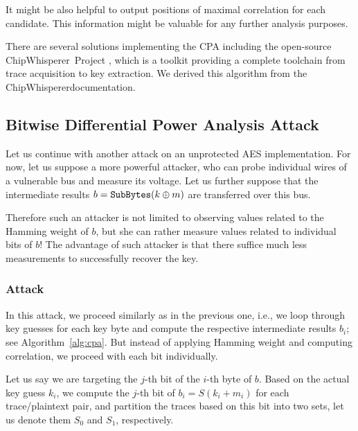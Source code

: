 	\begin{note}
	\label{note:leakpos}
		It might be also helpful to output positions of maximal correlation for each candidate. This information might be valuable for any further analysis purposes.
	\end{note}
	
	There are several solutions implementing the CPA including the open-source ChipWhisperer\texttrademark\ Project \cite{chipwhisperer}, which is a toolkit providing a complete toolchain from trace acquisition to key extraction. We derived this algorithm from the ChipWhisperer\texttrademark documentation.



\subsection{Bitwise Differential Power Analysis Attack}

Let us continue with another attack on an unprotected AES implementation. For now, let us suppose a more powerful attacker, who can probe individual wires of a vulnerable bus and measure its voltage. Let us further suppose that the intermediate results $b = \texttt{SubBytes}(k\oplus m)$ are transferred over this bus.

Therefore such an attacker is not limited to observing values related to the Hamming weight of $b$, but she can rather measure values related to individual bits of $b$! The advantage of such attacker is that there suffice much less measurements to successfully recover the key.

\subsubsection{Attack}
	
	In this attack, we proceed similarly as in the previous one, i.e., we loop through key guesses for each key byte and compute the respective intermediate results $b_i$; see Algorithm~\ref{alg:cpa}. But instead of applying Hamming weight and computing correlation, we proceed with each bit individually.
	
	Let us say we are targeting the $j$-th bit of the $i$-th byte of $b$. Based on the actual key guess $k_i$, we compute the $j$-th bit of $b_i = S(k_i+m_i)$ for each trace/plaintext pair, and partition the traces based on this bit into two sets, let us denote them $S_0$ and $S_1$, respectively.
	
